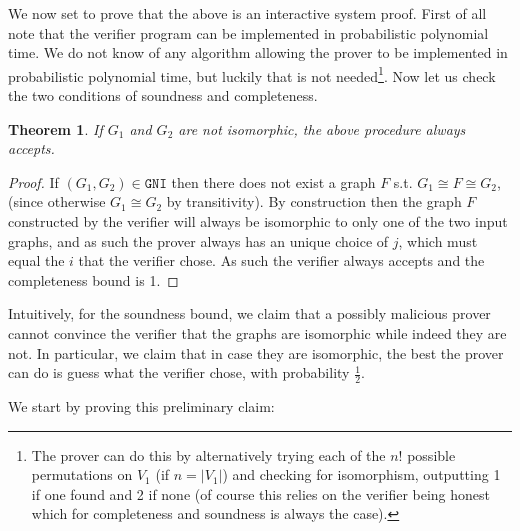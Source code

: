 \documentclass{article}
\newtheorem{theorem}{Theorem}
\begin{document}
We now set to prove that the above is an interactive system proof. First of all note that the verifier program can be implemented in probabilistic polynomial time. We do not know of any algorithm allowing the prover to be implemented in probabilistic polynomial time, but luckily that is not needed\footnote{The prover can do this by alternatively trying each of the $n!$ possible permutations on $V_1$ (if $n = |V_1|$) and checking for isomorphism, outputting 1 if one found and 2 if none (of course this relies on the verifier being honest which for completeness and soundness is always the case). }. Now let us check the two conditions of soundness and completeness.
\begin{theorem}
    If $G_1$ and $G_2$ are not isomorphic, the above procedure always accepts.
\end{theorem}
\begin{proof}
    If $(G_1, G_2) \in \texttt{GNI}$ then there does not exist a graph $F$ s.t. $G_1 \cong F \cong G_2$, (since otherwise $G_1 \cong G_2$ by transitivity). By construction then the graph $F$ constructed by the verifier will always be isomorphic to only one of the two input graphs, and as such the prover always has an unique choice of $j$, which must equal the $i$ that the verifier chose. As such the verifier always accepts and the completeness bound is 1.
\end{proof}

Intuitively, for the soundness bound, we claim that a possibly malicious prover cannot convince the verifier that the graphs are isomorphic while indeed they are not. In particular, we claim that in case they are isomorphic, the best the prover can do is guess what the verifier chose, with probability $\frac{1}{2}$.

We start by proving this preliminary claim:
\end{document}
